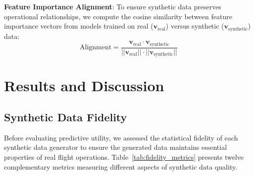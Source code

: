 \documentclass[conference]{IEEEtran}
\begin{document}
\textbf{Feature Importance Alignment}:
To ensure synthetic data preserves operational relationships, we compute the cosine similarity between feature importance vectors from models trained on real ($\mathbf{v}_{\text{real}}$) versus synthetic ($\mathbf{v}_{\text{synthetic}}$) data:
\begin{equation}
\text{Alignment} = \frac{\mathbf{v}_{\text{real}} \cdot \mathbf{v}_{\text{synthetic}}}{||\mathbf{v}_{\text{real}}|| \cdot ||\mathbf{v}_{\text{synthetic}}||}
\end{equation}



\section{Results and Discussion}

\subsection{Synthetic Data Fidelity}
\label{sec:fidelity_results}

Before evaluating predictive utility, we assessed the statistical fidelity of each synthetic data generator to ensure the generated data maintains essential properties of real flight operations. Table~\ref{tab:fidelity_metrics} presents twelve complementary metrics measuring different aspects of synthetic data quality.
\end{document}
